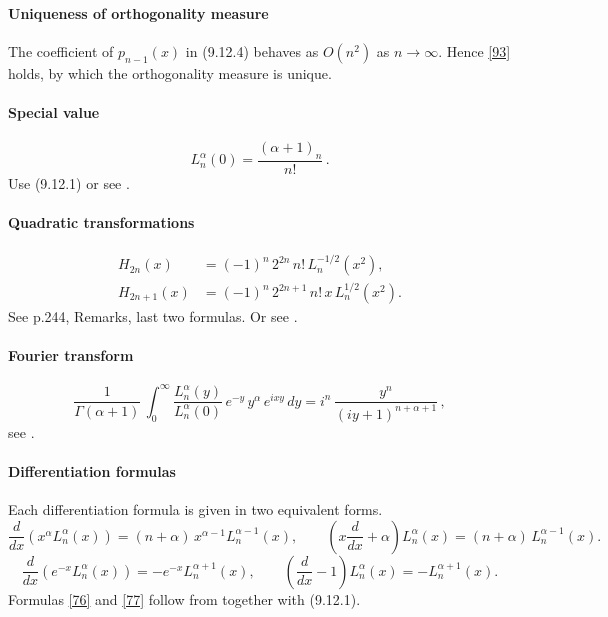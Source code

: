 \documentclass[twoside,11pt]{article}
\newcommand\al\alpha
\newcommand\Ga{\Gamma}
\newcommand\iy\infty
\begin{document}
\paragraph{Uniqueness of orthogonality measure}
The coefficient of $p_{n-1}(x)$ in (9.12.4) behaves as $O(n^2)$ as $n\to\iy$.
Hence \eqref{93} holds, by which the orthogonality measure is unique.
%
\paragraph{Special value}
\begin{equation}
L_n^{\al}(0)=\frac{(\al+1)_n}{n!}\,.
\label{53}
\end{equation}
Use (9.12.1) or see \cite[(18.6.1)]{DLMF}.
%
\paragraph{Quadratic transformations}
\begin{align}
H_{2n}(x)&=(-1)^n\,2^{2n}\,n!\,L_n^{-1/2}(x^2),
\label{54}\\
H_{2n+1}(x)&=(-1)^n\,2^{2n+1}\,n!\,x\,L_n^{1/2}(x^2).
\label{55}
\end{align}
See p.244, Remarks, last two formulas.
Or see \cite[(18.7.19), (18.7.20)]{DLMF}.
%
\paragraph{Fourier transform}
\begin{equation}
\frac1{\Ga(\al+1)}\,\int_0^\iy \frac{L_n^\al(y)}{L_n^\al(0)}\,
e^{-y}\,y^\al\,e^{ixy}\,dy=
i^n\,\frac{y^n}{(iy+1)^{n+\al+1}}\,,
\label{14}
\end{equation}
see \cite[(18.17.34)]{DLMF}.
%
\paragraph{Differentiation formulas}
Each differentiation formula is given in two equivalent forms.
\begin{equation}
\frac d{dx}\left(x^\al L_n^\al(x)\right)=
(n+\al)\,x^{\al-1} L_n^{\al-1}(x),\qquad
\left(x\frac d{dx}+\al\right)L_n^\al(x)=
(n+\al)\,L_n^{\al-1}(x).
\label{76}
\end{equation}
%
\begin{equation}
\frac d{dx}\left(e^{-x} L_n^\al(x)\right)=
-e^{-x} L_n^{\al+1}(x),\qquad
\left(\frac d{dx}-1\right)L_n^\al(x)=
-L_n^{\al+1}(x).
\label{77}
\end{equation}
%
Formulas \eqref{76} and \eqref{77} follow from \cite[(13.3.18), (13.3.20)]{DLMF}
together with (9.12.1). 
%
\end{document}
